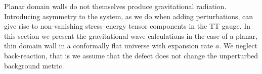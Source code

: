 



\newcommand{\ah}{\ALIASah}          %
\newcommand{\Src}{f}                %
\newcommand{\polplus}{\ALIASpolplus}
\newcommand{\polcross}{\ALIASpolcross}
 






Planar domain walls do not themselves produce gravitational radiation. Introducing asymmetry to the system, as we do when adding perturbations, can give rise to non-vanishing stress--energy tensor components in the TT gauge. %
In this section we present the gravitational-wave calculations in the case of a planar, thin domain wall in a conformally flat universe with expansion rate $a$. %
We neglect back-reaction, that is we assume that the defect does not change the unperturbed background metric. 









